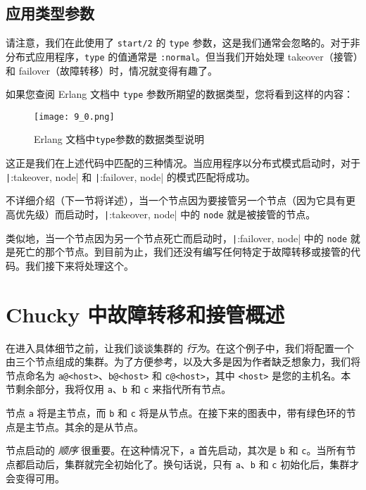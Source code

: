 \subsection{应用类型参数}

请注意，我们在此使用了 \texttt{start/2} 的
\texttt{type}
参数，这是我们通常会忽略的。对于非分布式应用程序，\texttt{type}
的值通常是 \texttt{:normal}。但当我们开始处理
takeover（接管）和 failover（故障转移）时，情况就变得有趣了。

如果您查阅 Erlang 文档中 \texttt{type}
参数所期望的数据类型，您将看到这样的内容：

\begin{figure}[!ht]
    \centering
    \texttt{[image: 9\_0.png]}
    \caption{Erlang 文档中\texttt{type}参数的数据类型说明}
    \label{fig:9_0}
\end{figure}

这正是我们在上述代码中匹配的三种情况。当应用程序以分布式模式启动时，对于
\texttt|{:takeover, node}| 和
\texttt|{:failover, node}| 的模式匹配将成功。

不详细介绍（下一节将详述），当一个节点因为要接管另一个节点（因为它具有更高优先级）而启动时，\texttt|{:takeover, node}|
中的 \texttt{node} 就是被接管的节点。

类似地，当一个节点因为另一个节点死亡而启动时，\texttt|{:failover, node}|
中的 \texttt{node}
就是死亡的那个节点。到目前为止，我们还没有编写任何特定于故障转移或接管的代码。我们接下来将处理这个。

\section{Chucky 中故障转移和接管概述}

在进入具体细节之前，让我们谈谈集群的
\emph{行为}。在这个例子中，我们将配置一个由三个节点组成的集群。为了方便参考，以及大多是因为作者缺乏想象力，我们将节点命名为
\texttt{a@<host>}、\texttt{b@<host>}
和 \texttt{c@<host>}，其中
\texttt{<host>} 是您的主机名。本节剩余部分，我将仅用
\texttt{a}、\texttt{b} 和
\texttt{c} 来指代所有节点。

节点 \texttt{a} 将是主节点，而
\texttt{b} 和 \texttt{c}
将是从节点。在接下来的图表中，带有绿色环的节点是主节点。其余的是从节点。

节点启动的 \emph{顺序} 很重要。在这种情况下，\texttt{a}
首先启动，其次是 \texttt{b} 和
\texttt{c}。当所有节点都启动后，集群就完全初始化了。换句话说，只有
\texttt{a}、\texttt{b} 和
\texttt{c} 初始化后，集群才会变得可用。

